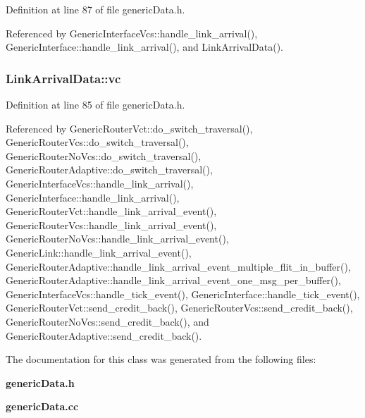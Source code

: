 Definition at line 87 of file genericData.h.

Referenced by GenericInterfaceVcs::handle\_\-link\_\-arrival(), GenericInterface::handle\_\-link\_\-arrival(), and LinkArrivalData().
\subsubsection[{vc}]{ {\bf LinkArrivalData::vc}}\label{classLinkArrivalData_0015d63ec0989b053ebd3236688d9e9a}




Definition at line 85 of file genericData.h.

Referenced by GenericRouterVct::do\_\-switch\_\-traversal(), GenericRouterVcs::do\_\-switch\_\-traversal(), GenericRouterNoVcs::do\_\-switch\_\-traversal(), GenericRouterAdaptive::do\_\-switch\_\-traversal(), GenericInterfaceVcs::handle\_\-link\_\-arrival(), GenericInterface::handle\_\-link\_\-arrival(), GenericRouterVct::handle\_\-link\_\-arrival\_\-event(), GenericRouterVcs::handle\_\-link\_\-arrival\_\-event(), GenericRouterNoVcs::handle\_\-link\_\-arrival\_\-event(), GenericLink::handle\_\-link\_\-arrival\_\-event(), GenericRouterAdaptive::handle\_\-link\_\-arrival\_\-event\_\-multiple\_\-flit\_\-in\_\-buffer(), GenericRouterAdaptive::handle\_\-link\_\-arrival\_\-event\_\-one\_\-msg\_\-per\_\-buffer(), GenericInterfaceVcs::handle\_\-tick\_\-event(), GenericInterface::handle\_\-tick\_\-event(), GenericRouterVct::send\_\-credit\_\-back(), GenericRouterVcs::send\_\-credit\_\-back(), GenericRouterNoVcs::send\_\-credit\_\-back(), and GenericRouterAdaptive::send\_\-credit\_\-back().

The documentation for this class was generated from the following files:\begin{CompactItemize}
\item 
{\bf genericData.h}\item 
{\bf genericData.cc}\end{CompactItemize}

